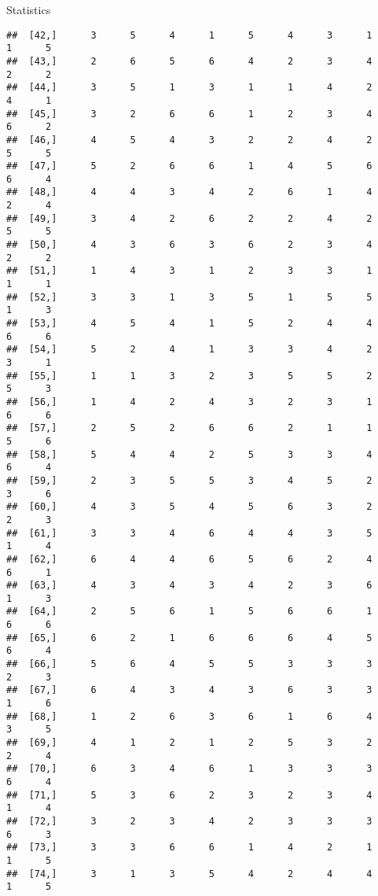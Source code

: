 \documentclass[
  ignorenonframetext,
]{beamer}
\begin{document}
\begin{frame}[fragile]{Statistics}
\begin{verbatim}
##  [42,]      3      5      4      1      5      4      3      1      1      5
##  [43,]      2      6      5      6      4      2      3      4      2      2
##  [44,]      3      5      1      3      1      1      4      2      4      1
##  [45,]      3      2      6      6      1      2      3      4      6      2
##  [46,]      4      5      4      3      2      2      4      2      5      5
##  [47,]      5      2      6      6      1      4      5      6      6      4
##  [48,]      4      4      3      4      2      6      1      4      2      4
##  [49,]      3      4      2      6      2      2      4      2      5      5
##  [50,]      4      3      6      3      6      2      3      4      2      2
##  [51,]      1      4      3      1      2      3      3      1      1      1
##  [52,]      3      3      1      3      5      1      5      5      1      3
##  [53,]      4      5      4      1      5      2      4      4      6      6
##  [54,]      5      2      4      1      3      3      4      2      3      1
##  [55,]      1      1      3      2      3      5      5      2      5      3
##  [56,]      1      4      2      4      3      2      3      1      6      6
##  [57,]      2      5      2      6      6      2      1      1      5      6
##  [58,]      5      4      4      2      5      3      3      4      6      4
##  [59,]      2      3      5      5      3      4      5      2      3      6
##  [60,]      4      3      5      4      5      6      3      2      2      3
##  [61,]      3      3      4      6      4      4      3      5      1      4
##  [62,]      6      4      4      6      5      6      2      4      6      1
##  [63,]      4      3      4      3      4      2      3      6      1      3
##  [64,]      2      5      6      1      5      6      6      1      6      6
##  [65,]      6      2      1      6      6      6      4      5      6      4
##  [66,]      5      6      4      5      5      3      3      3      2      3
##  [67,]      6      4      3      4      3      6      3      3      1      6
##  [68,]      1      2      6      3      6      1      6      4      3      5
##  [69,]      4      1      2      1      2      5      3      2      2      4
##  [70,]      6      3      4      6      1      3      3      3      6      4
##  [71,]      5      3      6      2      3      2      3      4      1      4
##  [72,]      3      2      3      4      2      3      3      3      6      3
##  [73,]      3      3      6      6      1      4      2      1      1      5
##  [74,]      3      1      3      5      4      2      4      4      1      5

\end{verbatim}
\end{frame}
\end{document}
